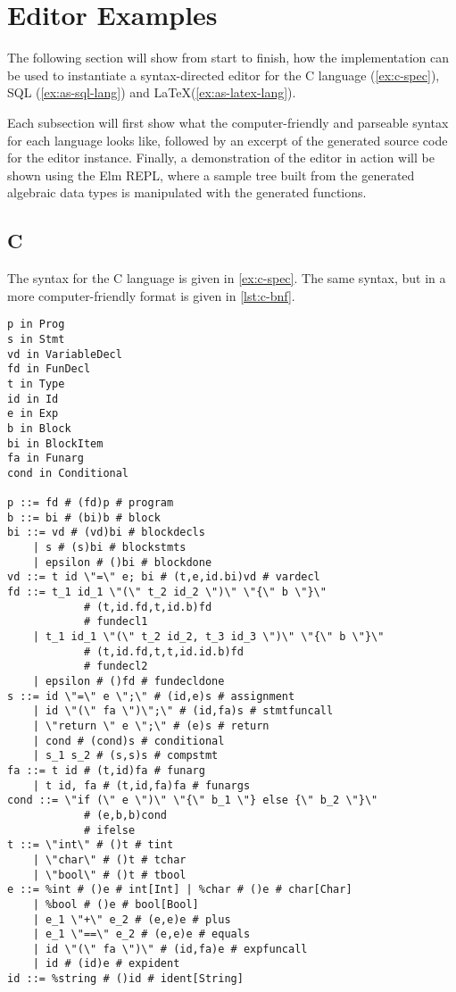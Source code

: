 \section{Editor Examples}

The following section will show from start to finish, how the implementation
can be used to instantiate a syntax-directed editor for the C language (\cref{ex:c-spec}),
SQL (\cref{ex:as-sql-lang}) and \LaTeX (\cref{ex:as-latex-lang}).

Each subsection will first show what the computer-friendly and parseable syntax
for each language looks like, followed by an excerpt of the generated
source code for the editor instance. Finally, a demonstration of the editor
in action will be shown using the Elm REPL, where a sample tree built
from the generated algebraic data types is manipulated with the generated functions.

\subsection{C}

The syntax for the C language is given in \cref{ex:c-spec}.
The same syntax, but in a more computer-friendly format is given in \cref{lst:c-bnf}.

\begin{lstlisting}[style=inline, caption={Parseable format of C language syntax}, label={lst:c-bnf}]
p in Prog
s in Stmt
vd in VariableDecl
fd in FunDecl
t in Type
id in Id
e in Exp
b in Block
bi in BlockItem
fa in Funarg
cond in Conditional

p ::= fd # (fd)p # program
b ::= bi # (bi)b # block
bi ::= vd # (vd)bi # blockdecls 
    | s # (s)bi # blockstmts 
    | epsilon # ()bi # blockdone
vd ::= t id \"=\" e; bi # (t,e,id.bi)vd # vardecl
fd ::= t_1 id_1 \"(\" t_2 id_2 \")\" \"{\" b \"}\" 
            # (t,id.fd,t,id.b)fd 
            # fundecl1 
    | t_1 id_1 \"(\" t_2 id_2, t_3 id_3 \")\" \"{\" b \"}\" 
            # (t,id.fd,t,t,id.id.b)fd 
            # fundecl2 
    | epsilon # ()fd # fundecldone
s ::= id \"=\" e \";\" # (id,e)s # assignment 
    | id \"(\" fa \")\";\" # (id,fa)s # stmtfuncall 
    | \"return \" e \";\" # (e)s # return 
    | cond # (cond)s # conditional 
    | s_1 s_2 # (s,s)s # compstmt
fa ::= t id # (t,id)fa # funarg 
    | t id, fa # (t,id,fa)fa # funargs
cond ::= \"if (\" e \")\" \"{\" b_1 \"} else {\" b_2 \"}\" 
            # (e,b,b)cond 
            # ifelse
t ::= \"int\" # ()t # tint 
    | \"char\" # ()t # tchar 
    | \"bool\" # ()t # tbool
e ::= %int # ()e # int[Int] | %char # ()e # char[Char] 
    | %bool # ()e # bool[Bool] 
    | e_1 \"+\" e_2 # (e,e)e # plus 
    | e_1 \"==\" e_2 # (e,e)e # equals 
    | id \"(\" fa \")\" # (id,fa)e # expfuncall 
    | id # (id)e # expident
id ::= %string # ()id # ident[String]
\end{lstlisting}

